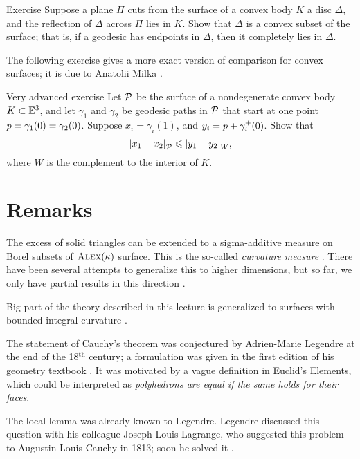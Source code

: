\begin{thm}{Exercise}\label{ex:convex}
Suppose a plane $\Pi$ cuts from the surface of a convex body $K$ a disc $\Delta$, and the reflection of $\Delta$ across $\Pi$ lies in $K$.
Show that $\Delta$ is a convex subset of the surface;
that is, if a geodesic has endpoints in $\Delta$, then it completely lies in $\Delta$.
\end{thm}

The following exercise gives a more exact version of comparison for convex surfaces;
it is due to Anatolii Milka \cite[Theorem 2]{milka1982}.

\begin{thm}{Very advanced exercise}\label{ex:milka}
Let $\mathcal{P}$ be the surface of a nondegenerate convex body $K\subset\mathbb{E}^3$,
and let $\gamma_1$ and $\gamma_2$ be geodesic paths in $\mathcal{P}$ that start at one point $p=\gamma_1(0)=\gamma_2(0)$.
Suppose $x_i=\gamma_i(1)$, and $y_i=p+\gamma_i^+(0)$.
Show that
\[|{x_1}-{x_2}|_{\mathcal{P}}^{{}}\leqslant |{y_1}-{y_2}|_{W}^{{}},\]
where $W$ is the complement to the interior of $K$.

\end{thm}



\section{Remarks}

The excess of solid triangles can be extended to a sigma-additive measure on Borel subsets of $\textsc{Alex}(\kappa)$ surface.
This is the so-called \emph{curvature measure} \cite[V]{alexandrov-1948}.
There have been several attempts to generalize this to higher dimensions, but so far, we only have partial results in this direction \cite{gigli2018, lebedeva-petrunin2024b}.

Big part of the theory described in this lecture is generalized to surfaces with bounded integral curvature \cite{alexandrov-zalgaller,reshetnyak1993}.

The statement of Cauchy's theorem was conjectured by Adrien-Marie Legendre at the end of the 18$^\text{th}$ century;
a formulation was given in the first edition of his geometry textbook \cite{legendre}.
It was motivated by a vague definition in Euclid's Elements, which could be interpreted as
\textit{polyhedrons are equal if the same holds for their faces}.

The local lemma was already known to Legendre.
Legendre discussed this question with his colleague Joseph-Louis Lagrange, who suggested this problem to Augustin-Louis Cauchy in 1813; soon he solved it \cite{cauchy}.

